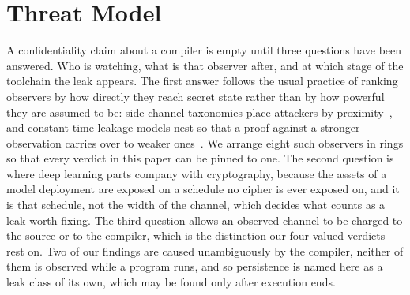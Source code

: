 \section{Threat Model}
\label{sec:threat}
A confidentiality claim about a compiler is empty until three questions have been answered.
Who is watching, what is that observer after, and at which stage of the toolchain the leak appears.
The first answer follows the usual practice of ranking observers by
how directly they reach secret state rather than by how powerful they
are assumed to be: side-channel taxonomies place attackers by
proximity~\cite{spreitzer2018classification}, and constant-time
leakage models nest so that a proof against a stronger observation
carries over to weaker ones~\cite{molnar2005pcmodel,almeida2016ctverif}.
We arrange eight such observers in rings so that every verdict in this
paper can be pinned to one.
The second question is where deep learning parts company with cryptography, because the assets of a model deployment are exposed on a schedule no cipher is ever exposed on, and it is that schedule, not the width of the channel, which decides what counts as a leak worth fixing.
The third question allows an observed channel to be charged to the source or to the compiler, which is the distinction our four-valued verdicts rest on.
Two of our findings are caused unambiguously by the compiler, neither of them is observed while a program runs, and so persistence is named here as a leak class of its own, which may be found only after execution ends.
